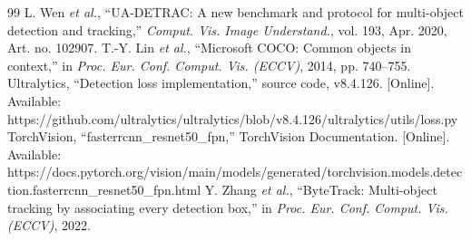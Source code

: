 \documentclass[10pt,journal,letterpaper]{IEEEtran}
\begin{document}
\begin{thebibliography}{99}
 L. Wen \textit{et al.}, ``UA-DETRAC: A new benchmark and protocol for multi-object detection and tracking,'' \textit{Comput. Vis. Image Understand.}, vol. 193, Apr. 2020, Art. no. 102907.
 T.-Y. Lin \textit{et al.}, ``Microsoft COCO: Common objects in context,'' in \textit{Proc. Eur. Conf. Comput. Vis. (ECCV)}, 2014, pp. 740--755.
 Ultralytics, ``Detection loss implementation,'' source code, v8.4.126. [Online]. Available: https://github.com/ultralytics/ultralytics/blob/v8.4.126/ultralytics/utils/loss.py
 TorchVision, ``fasterrcnn\_resnet50\_fpn,'' TorchVision Documentation. [Online]. Available: https://docs.pytorch.org/vision/main/models/generated/torchvision.models.detection.fasterrcnn\_resnet50\_fpn.html
 Y. Zhang \textit{et al.}, ``ByteTrack: Multi-object tracking by associating every detection box,'' in \textit{Proc. Eur. Conf. Comput. Vis. (ECCV)}, 2022.
\end{thebibliography}
\end{document}
